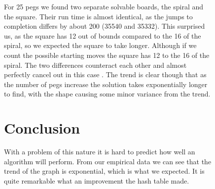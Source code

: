 \documentclass[11pt]{article}
\begin{document}
\newpage
\begin{figure}
For 25 pegs we found two separate solvable boards, the spiral and the square. Their run time is almost identical, as the jumps to completion differs by about 200 (35540 and 35332). This surprised us, as the square has 12 out of bounds compared to the 16 of the spiral, so we expected the square to take longer. Although if we count the possible starting moves the square has 12 to the 16 of the spiral. The two differences counteract each other and almost perfectly cancel out in this case
\newline.
\newline
The trend is clear though that as the number of pegs increase the solution takes exponentially longer to find, with the shape causing some minor variance from the trend.

\section{Conclusion}
With a problem of this nature it is hard to predict how well an algorithm will perform. From our empirical data we can see that the trend of the graph is exponential, which is what we expected. It is quite remarkable what an improvement the hash table made.

\end{figure}

\newpage
\begin{figure}



\end{figure}
\end{document}
